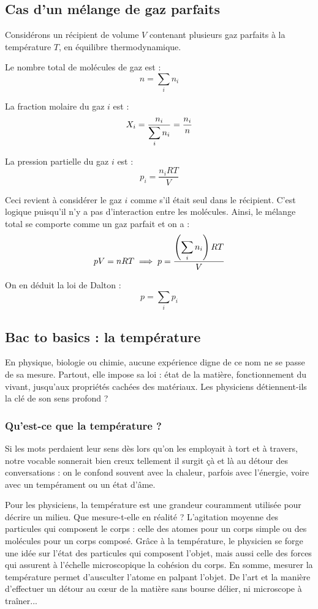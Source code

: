 \subsection{Cas d'un mélange de gaz parfaits}

Considérons un récipient de volume \(V\) contenant plusieurs gaz parfaits à la température \(T\), en équilibre thermodynamique.

Le nombre total de molécules de gaz est : \[n=\sum_in_i\]

La fraction molaire du gaz \(i\) est : \[X_i=\dfrac{n_i}{\displaystyle\sum_in_i}=\dfrac{n_i}{n}\]

La pression partielle du gaz \(i\) est : \[p_i=\dfrac{n_iRT}{V}\]

Ceci revient à considérer le gaz \(i\) comme s'il était seul dans le récipient. C'est logique puisqu'il n'y a pas d'interaction entre les molécules. Ainsi, le mélange total se comporte comme un gaz parfait et on a : \[pV=nRT\implies p=\dfrac{\left(\displaystyle\sum_in_i\right)RT}{V}\]

On en déduit la loi de Dalton : \[p=\sum_ip_i\]

\subsection{Bac to basics : la température}

En physique, biologie ou chimie, aucune expérience digne de ce nom ne se passe de sa mesure. Partout, elle impose sa loi : état de la matière, fonctionnement du vivant, jusqu'aux propriétés cachées des matériaux. Les physiciens détiennent-ils la clé de son sens profond ?

\subsubsection{Qu'est-ce que la température ?}

Si les mots perdaient leur sens dès lors qu'on les employait à tort et à travers, notre vocable sonnerait bien creux tellement il surgit çà et là au détour des conversations : on le confond souvent avec la chaleur, parfois avec l'énergie, voire avec un tempérament ou un état d'âme.

Pour les physiciens, la température est une grandeur couramment utilisée pour décrire un milieu. Que mesure-t-elle en réalité ? L'agitation moyenne des particules qui composent le corps : celle des atomes pour un corps simple ou des molécules pour un corps composé. Grâce à la température, le physicien se forge une idée sur l'état des particules qui composent l'objet, mais aussi celle des forces qui assurent à l'échelle microscopique la cohésion du corps. En somme, mesurer la température permet d'ausculter l'atome en palpant l'objet. De l'art et la manière d'effectuer un détour au cœur de la matière sans bourse délier, ni microscope à traîner...

